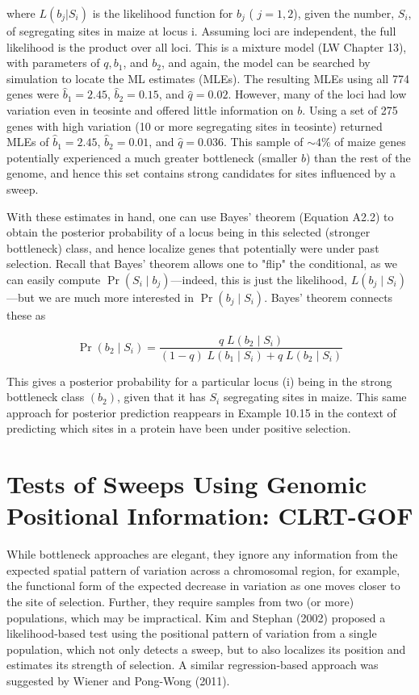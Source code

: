 \documentclass{article}
\begin{document}
where  $ L(b_j | S_i) $ is the likelihood function for  $ b_j $ ( $ j = 1, 2 $), given the number,  $ S_i $, of segregating sites in maize at locus i. Assuming loci are independent, the full likelihood is the product over all loci. This is a mixture model (LW Chapter 13), with parameters of  $ q, b_1 $, and  $ b_2 $, and again, the model can be searched by simulation to locate the ML estimates (MLEs). The resulting MLEs using all 774 genes were  $ \widehat{b}_1 = 2.45 $,  $ \widehat{b}_2 = 0.15 $, and  $ \widehat{q} = 0.02 $. However, many of the loci had low variation even in teosinte and offered little information on  $ b $. Using a set of 275 genes with high variation (10 or more segregating sites in teosinte) returned MLEs of  $ \widehat{b}_1 = 2.45 $,  $ \widehat{b}_2 = 0.01 $, and  $ \widehat{q} = 0.036 $. This sample of  $ \sim4\% $ of maize genes potentially experienced a much greater bottleneck (smaller  $ b $) than the rest of the genome, and hence this set contains strong candidates for sites influenced by a sweep.

With these estimates in hand, one can use Bayes' theorem (Equation A2.2) to obtain the posterior probability of a locus being in this selected (stronger bottleneck) class, and hence localize genes that potentially were under past selection. Recall that Bayes' theorem allows one to "flip" the conditional, as we can easily compute  $ \Pr(S_i \mid b_j) $—indeed, this is just the likelihood,  $ L(b_j \mid S_i) $—but we are much more interested in  $ \Pr(b_j \mid S_i) $. Bayes' theorem connects these as

\begin{equation}
\Pr(b_{2}\mid S_{i})=\frac{q\;L(b_{2}\mid S_{i})}{(1-q)\;L(b_{1}\mid S_{i})+q\;L(b_{2}\mid S_{i})}
\tag{9.15b}
\label{eq:9_15b}
\end{equation}

This gives a posterior probability for a particular locus (i) being in the strong bottleneck class  $ (b_{2}) $, given that it has  $ S_{i} $ segregating sites in maize. This same approach for posterior prediction reappears in Example 10.15 in the context of predicting which sites in a protein have been under positive selection.

\section{Tests of Sweeps Using Genomic Positional Information: CLRT-GOF}
While bottleneck approaches are elegant, they ignore any information from the expected spatial pattern of variation across a chromosomal region, for example, the functional form of the expected decrease in variation as one moves closer to the site of selection. Further, they require samples from two (or more) populations, which may be impractical. Kim and Stephan (2002) proposed a likelihood-based test using the positional pattern of variation from a single population, which not only detects a sweep, but to also localizes its position and estimates its strength of selection. A similar regression-based approach was suggested by Wiener and Pong-Wong (2011).
\end{document}
